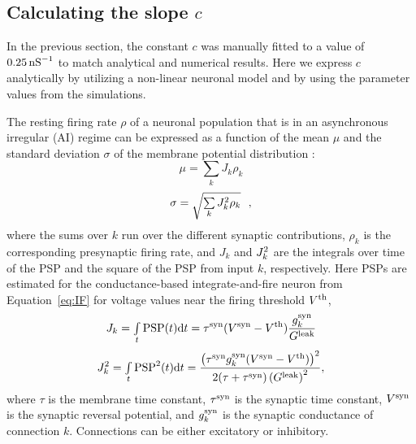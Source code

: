 %

  \subsection{Calculating the slope $c$}
  \label{sec:asss_calc}
    In the previous section, the constant $c$ was manually fitted to a value of
    $0.25 \, {\rm nS}^{-1}$ to match analytical and numerical results. Here we
    express $c$ analytically by utilizing a non-linear neuronal model and by
    using the parameter values from the simulations.

    The resting firing rate $\rho$ of a neuronal population that is in an
    asynchronous irregular (AI) regime can be expressed as a function of the
    mean $\mu$ and the standard deviation $\sigma$ of the membrane potential
    distribution \citep{Ricciardi2013, Amit1997, Brunel2000, Gerstner2002}:
    \[
      \mu = \sum_{k} J_k \rho_k
    \]
    \begin{equation}
      \sigma = \sqrt{\sum_{k} J^{\rm 2}_k \rho_k} \,\,\,\,,
    \label{eq:sigma_general}
    \end{equation}
    where the sums over $k$ run over the different synaptic contributions,
    $\rho_k$ is the corresponding presynaptic firing rate, and $J_k$ and
    $J^{\rm 2}_k$ are the integrals over time of the PSP and the square of the
    PSP from input $k$, respectively. Here PSPs are estimated for the
    conductance-based integrate-and-fire neuron from Equation~\ref{eq:IF} for voltage
    values near the firing threshold $V^{\rm th}$,
    \[
      J_k = \int_t{ \rm PSP}(t){\rm d} t = \tau^{\rm syn} (V^{\rm syn} - V^{\rm th}) \frac{g_k^{\rm syn}}{G^{\rm leak}}
    \]
    \[
      J^{2}_k = \int_t{ {\rm PSP}^2(t)}{\rm d}t = \frac{\left(\tau^{\rm syn} g_k^{\rm syn} (V^{\rm syn} - V^{\rm th}) \right)^2}{2(\tau + \tau^{\rm syn}) \left(G^{\rm leak} \right)^2} ,
    \]
    where $\tau$ is the membrane time constant, $\tau^{\rm syn}$ is the
    synaptic time constant, $V^{\rm syn}$ is the synaptic reversal potential,
    and $g_k^{\rm syn}$ is the synaptic conductance of connection $k$.
    Connections can be either excitatory or inhibitory.

